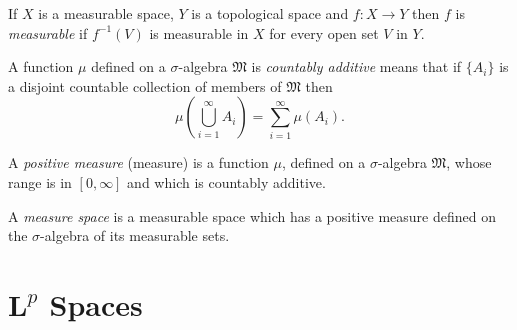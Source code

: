 \begin{dfn}
	If $X$ is a measurable space, $Y$ is a topological space and $f:X\rightarrow Y$ then $f$ is \emph{measurable} if $f^{-1}(V)$ is measurable in $X$ for every open set $V$ in $Y$.
\end{dfn}
\begin{dfn}
	A function $\mu$ defined on a $\sigma$-algebra $\mathfrak{M}$ is \emph{countably additive} means that if $\{A_i\}$ is a disjoint countable collection of members of $\mathfrak{M}$ then
	\begin{equation*}
		\mu(\bigcup_{i=1}^\infty A_i)=\sum_{i=1}^\infty\mu(A_i).
	\end{equation*}
\end{dfn}
\begin{dfn}
	A \emph{positive measure} (measure) is a function $\mu$, defined on a $\sigma$-algebra $\mathfrak{M}$, whose range is in $[0,\infty]$ and which is countably additive.
\end{dfn}
\begin{dfn}
	A \emph{measure space} is a measurable space which has a positive measure defined on the $\sigma$-algebra of its measurable sets.
\end{dfn}
\begin{comment}
A set is Lebesque measurable if it can be assigned a volume.
\begin{dfn}\index{Lebesgue measurable}
	See \cite{rudin_1} p. 53
\end{dfn}
\begin{dfn}\index{Lebesgue measure}
	See \cite{rudin_1} p. 53
\end{dfn}

\section{$L^p$ Spaces}
\begin{dfn}\index{$L^p$ norm}
	If $X$ is an arbitrary measure space with positve measure $\mu$
\end
\begin{dfn}\index{$L^p$ norm}
	
\end
\end{comment}

\section{$\mathbf{L}^p$ Spaces}

